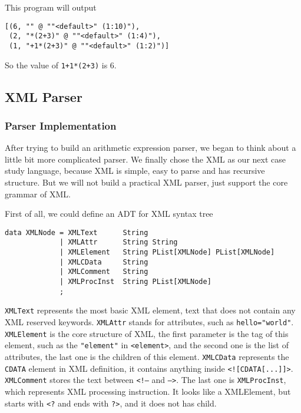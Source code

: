 This program will output

\begin{lstlisting}
[(6, "" @ ""<default>" (1:10)"),
 (2, "*(2+3)" @ ""<default>" (1:4)"),
 (1, "+1*(2+3)" @ ""<default>" (1:2)")]
\end{lstlisting}

So the value of \texttt{1+1*(2+3)} is 6.

\subsection{XML Parser} \label{section:xml_parser}

\subsubsection{Parser Implementation}

After trying to build an arithmetic expression parser, we began to think about a little bit more complicated parser. We finally chose the XML as our next case study language, because XML is simple, easy to parse and has recursive structure. But we will not build a practical XML parser, just support the core grammar of XML.

First of all, we could define an ADT for XML syntax tree

\begin{lstlisting}
data XMLNode = XMLText      String
             | XMLAttr      String String
             | XMLElement   String PList[XMLNode] PList[XMLNode]
             | XMLCData     String
             | XMLComment   String
             | XMLProcInst  String PList[XMLNode]
             ;
\end{lstlisting}

\texttt{XMLText} represents the most basic XML element, text that does not contain any XML reserved keywords. \texttt{XMLAttr} stands for attributes, such as \texttt{hello="world"}. \texttt{XMLElement} is the core structure of XML, the first parameter is the tag of this element, such as the \texttt{"element"} in \texttt{<element>}, and the second one is the list of attributes, the last one is the children of this element. \texttt{XMLCData} represents the \texttt{CDATA} element in XML definition, it contains anything inside \texttt{<![CDATA[...]]>}. \texttt{XMLComment} stores the text between \texttt{<!--} and \texttt{-->}. The last one is \texttt{XMLProcInst}, which represents XML processing instruction. It looks like a XMLElement, but starts with \texttt{<?} and ends with \texttt{?>}, and it does not has child.

